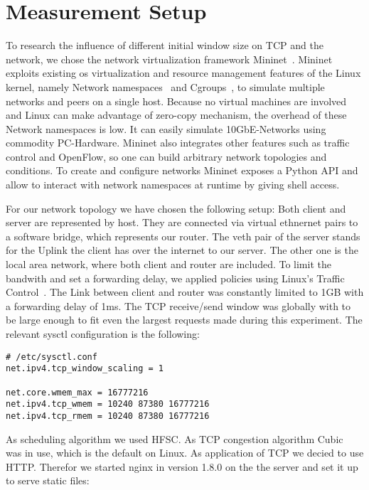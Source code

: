 \section{Measurement Setup}
\label{sec:measurement_setup}

To research the influence of different initial window size on TCP and the
network, we chose the network virtualization framework Mininet~\cite{mininet}.
Mininet exploits existing os virtualization and resource management features of
the Linux kernel, namely Network namespaces~\cite{network_namespaces} and
Cgroups~\cite{cgroups}, to simulate multiple networks and peers on a single
host. Because no virtual machines are involved and Linux can make advantage of
zero-copy mechanism, the overhead of these Network namespaces is low. It can
easily simulate 10GbE-Networks using commodity PC-Hardware. Mininet also
integrates other features such as traffic control and OpenFlow, so one can build
arbitrary network topologies and conditions. To create and configure networks
Mininet exposes a Python API and allow to interact with network namespaces at
runtime by giving shell access.



For our network topology we have chosen the following setup: Both client and
server are represented by host. They are connected via virtual ethnernet pairs
to a software bridge, which represents our router. The veth pair of the server
stands for the Uplink the client has over the internet to our server. The other
one is the local area network, where both client and router are included.
To limit the bandwith and set a forwarding delay, we applied policies using
Linux's Traffic Control~\cite{tc}. The Link between client and router was
constantly limited to 1GB with a forwarding delay of 1ms. The TCP receive/send
window was globally with to be large enough to fit even the largest requests
made during this experiment. The relevant sysctl configuration is the following:

\begin{lstlisting}
# /etc/sysctl.conf
net.ipv4.tcp_window_scaling = 1

net.core.wmem_max = 16777216
net.ipv4.tcp_wmem = 10240 87380 16777216
net.ipv4.tcp_rmem = 10240 87380 16777216
\end{lstlisting}

As scheduling algorithm we used HFSC. As TCP congestion algorithm
Cubic~\cite{cubic} was in use, which is the default on Linux. As application of
TCP we decied to use HTTP. Therefor we started nginx in version 1.8.0 on the the server
and set it up to serve static files:

